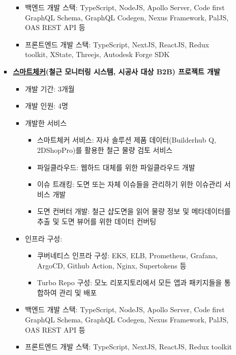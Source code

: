\begin{itemize}[label=]
\begin{itemize}[label=]
\begin{itemize}[label=]
\begin{itemize}[label=]
\begin{itemize}
			                  \end{itemize}
			            \item 백엔드 개발 스택: TypeScript, NodeJS, Apollo Server, Code first GraphQL Schema, GraphQL Codegen, Nexus Framework, PalJS, OAS REST API 등
			            \item 프론트엔드 개발 스택: TypeScript, NextJS, ReactJS, Redux toolkit, XState, Threejs, Autodesk Forge SDK
		            \end{itemize}
		      \item \textbf{\href{https://check.builderhub.io/signin}{스마트체커}(철근 모니터링 시스템, 시공사 대상 B2B) 프로젝트 개발} \hyperref[smartchecker]{\space {}}
		            \begin{itemize}[label=]
			            \item 개발 기간: 3개월
			            \item 개발 인원: 4명
			            \item 개발한 서비스
			                  \begin{itemize}
				                  \item 스마트체커 서비스: 자사 솔루션 제품 데이터(Builderhub Q, 2DShopPro)를 활용한 철근 물량 검토 서비스
				                  \item 파일클라우드: 웹하드 대체를 위한 파일클라우드 개발
				                  \item 이슈 트래킹: 도면 또는 자체 이슈들을 관리하기 위한 이슈관리 서비스 개발
				                  \item 도면 컨버터 개발: 철근 샵도면을 읽어 물량 정보 및 메타데이터를 추출 및 도면 뷰어를 위한 데이터 컨버팅
			                  \end{itemize}
			            \item 인프라 구성:
			                  \begin{itemize}
				                  \item 쿠버네티스 인프라 구성: EKS, ELB, Prometheus, Grafana, ArgoCD, Github Action, Nginx, Supertokens 등
				                  \item Turbo Repo 구성: 모노 리포지토리에서 모든 앱과 패키지들을 통합하여 관리 및 배포
			                  \end{itemize}
			            \item 백엔드 개발 스택: TypeScript, NodeJS, Apollo Server, Code first GraphQL Schema, GraphQL Codegen, Nexus Framework, PalJS, OAS REST API 등
			            \item 프론트엔드 개발 스택: TypeScript, NextJS, ReactJS, Redux toolkit

\end{itemize}
\end{itemize}
\end{itemize}
\end{itemize}
